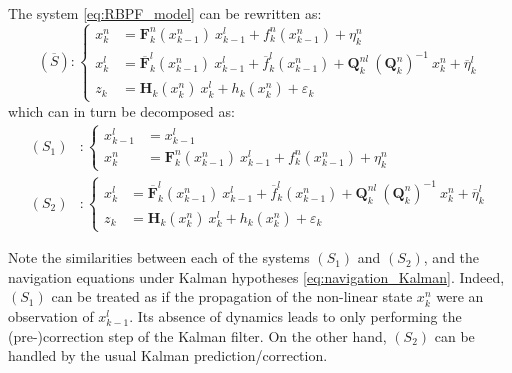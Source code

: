 The system \eqref{eq:RBPF_model} can be rewritten as:
\begin{equation}
	\left(\overline{S}\right):\left\{\begin{aligned}
	x_k^n&=\mathbf{F}_k^n\left(x_{k-1}^n\right)\:x_{k-1}^l+f_k^n\left(x_{k-1}^n\right)+\eta_k^n\\
	x_k^l&=\overline{\mathbf{F}}_k^l\left(x_{k-1}^n\right)\:x_{k-1}^l+\overline{f}_k^l\left(x_{k-1}^n\right)+\mathbf{Q}_k^{nl}\:(\mathbf{Q}_k^n)^{-1}\:x_k^n+\overline{\eta}_k^l\\
	z_k&=\mathbf{H}_k\left(x_k^n\right)\:x_k^l+h_k\left(x_k^n\right)+\varepsilon_k
	\end{aligned}\right.
\end{equation}
which can in turn be decomposed as:
\begin{equation}
	\begin{aligned}
	(S_1)&:\left\{\begin{aligned}
	x_{k-1}^l&=x_{k-1}^l\\
	x_k^n&=\mathbf{F}_k^n\left(x_{k-1}^n\right)\:x_{k-1}^l+f_k^n\left(x_{k-1}^n\right)+\eta_k^n
	\end{aligned}\right.\\
	(S_2)&:\left\{\begin{aligned}
	x_k^l&=\overline{\mathbf{F}}_k^l\left(x_{k-1}^n\right)\:x_{k-1}^l+\overline{f}_k^l\left(x_{k-1}^n\right)+\mathbf{Q}_k^{nl}\:(\mathbf{Q}_k^n)^{-1}\:x_k^n+\overline{\eta}_k^l\\
	z_k&=\mathbf{H}_k\left(x_k^n\right)\:x_k^l+h_k\left(x_k^n\right)+\varepsilon_k
	\end{aligned}\right.
	\end{aligned}
\end{equation}

Note the similarities between each of the systems $(S_1)$ and $(S_2)$, and the navigation equations under Kalman hypotheses \eqref{eq:navigation_Kalman}. Indeed, $(S_1)$ can be treated as if the propagation of the non-linear state $x_k^n$ were an observation of $x_{k-1}^l$. Its absence of dynamics leads to only performing the (pre-)correction step of the Kalman filter. On the other hand, $(S_2)$ can be handled by the usual Kalman prediction/correction.

